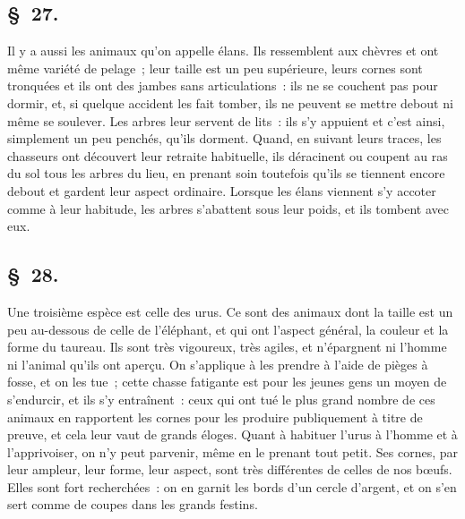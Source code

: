 \documentclass[french,twoside]{book} %
\begin{document}
\subsection[{§ 27.}]{ \textsc{§ 27.} }
\noindent Il y a aussi les animaux qu’on appelle élans. Ils ressemblent aux chèvres et ont même variété de pelage ; leur taille est un peu supérieure, leurs cornes sont tronquées et ils ont des jambes sans articulations : ils ne se couchent pas pour dormir, et, si quelque accident les fait tomber, ils ne peuvent se mettre debout ni même se soulever. Les arbres leur servent de lits : ils s’y appuient et c’est ainsi, simplement un peu penchés, qu’ils dorment. Quand, en suivant leurs traces, les chasseurs ont découvert leur retraite habituelle, ils déracinent ou coupent au ras du sol tous les arbres du lieu, en prenant soin toutefois qu’ils se tiennent encore debout et gardent leur aspect ordinaire. Lorsque les élans viennent s’y accoter comme à leur habitude, les arbres s’abattent sous leur poids, et ils tombent avec eux.
\subsection[{§ 28.}]{ \textsc{§ 28.} }
\noindent Une troisième espèce est celle des urus. Ce sont des animaux dont la taille est un peu au-dessous de celle de l’éléphant, et qui ont l’aspect général, la couleur et la forme du taureau. Ils sont très vigoureux, très agiles, et n’épargnent ni l’homme ni l’animal qu’ils ont aperçu. On s’applique à les prendre à l’aide de pièges à fosse, et on les tue ; cette chasse fatigante est pour les jeunes gens un moyen de s’endurcir, et ils s’y entraînent : ceux qui ont tué le plus grand nombre de ces animaux en rapportent les cornes pour les produire publiquement à titre de preuve, et cela leur vaut de grands éloges. Quant à habituer l’urus à l’homme et à l’apprivoiser, on n’y peut parvenir, même en le prenant tout petit. Ses cornes, par leur ampleur, leur forme, leur aspect, sont très différentes de celles de nos bœufs. Elles sont fort recherchées : on en garnit les bords d’un cercle d’argent, et on s’en sert comme de coupes dans les grands festins.
\end{document}
